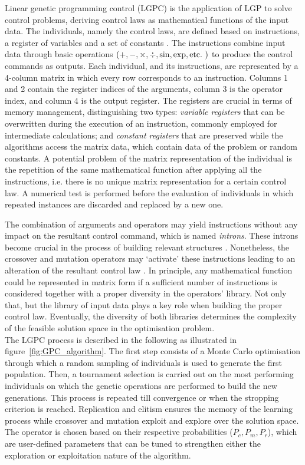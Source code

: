 Linear genetic programming control (LGPC) is the application of LGP to solve control problems, deriving control laws as mathematical functions of the input data. The individuals, namely the control laws, are defined based on instructions, a register of variables and a set of constants \citep{duriez2014MLC}. The instructions combine input data through basic operations $(+,-,\times,\div,\sin,\text{exp},\text{etc.\ })$ to produce the control commands as outputs. Each individual, and its instructions, are represented by a 4-column matrix in which every row corresponds to an instruction. Columns 1 and 2 contain the register indices of the arguments, column 3 is the operator index, and column 4 is the output register. The registers are crucial in terms of memory management, distinguishing two types: \textit{variable registers} that can be overwritten during the execution of an instruction, commonly employed for intermediate calculations; and \textit{constant registers} that are preserved while the algorithms access the matrix data, which contain data of the problem or random constants. A potential problem of the matrix representation of the individual is the repetition of the same mathematical function after applying all the instructions, i.e. there is no unique matrix representation for a certain control law. A numerical test is performed before the evaluation of individuals in which repeated instances are discarded and replaced by a new one.

The combination of arguments and operators may yield instructions without any impact on the resultant control command, which is named \textit{introns}. These introns become crucial in the process of building relevant structures \citep{cornejomacedaPhD}. Nonetheless, the crossover and mutation operators may `activate' these instructions leading to an alteration of the resultant control law \citep{duriez2017book}. In principle, any mathematical function could be represented in matrix form if a sufficient number of instructions is considered together with a proper diversity in the operators' library. Not only that, but the library of input data plays a key role when building the proper control law. Eventually, the diversity of both libraries determines the complexity of the feasible solution space in the optimisation problem. \\

The LGPC process is described in the following as illustrated in figure~\ref{fig:GPC_algorithm}. The first step consists of a Monte Carlo optimisation through which a random sampling of individuals is used to generate the first population. Then, a tournament selection is carried out on the most performing individuals on which the genetic operations are performed to build the new generations. This process is repeated till convergence or when the stropping criterion is reached. Replication and elitism ensures the memory of the learning process while crossover and mutation exploit and explore over the solution space. The operator is chosen based on their respective probabilities ($P_c,P_m,P_r$), which are user-defined parameters that can be tuned to strengthen either the exploration or exploitation nature of the algorithm.

